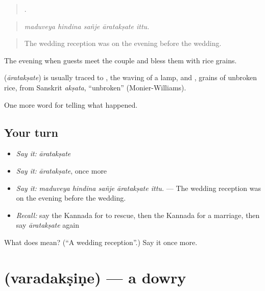 \begin{quote}
    .
\end{quote}

\begin{quote}
\emph{maduveya hindina sañje āratakṣate ittu.}
\end{quote}

\begin{quote}
The wedding reception was on the evening before the wedding.
\end{quote}

The evening when guests meet the couple and bless them with rice grains.

\begin{cousinweb}
\textbf{} (\emph{āratakṣate}) is usually traced to , the waving of a lamp, and , grains of unbroken rice, from Sanskrit \emph{akṣata}, \textquotedblleft{}unbroken\textquotedblright{} (Monier-Williams).
\end{cousinweb}

\begin{grammarlens}[title={What you've built}]
One more word for telling what happened.
\end{grammarlens}

\subsection*{Your turn}
\begin{itemize}
\raggedright
  \item \emph{Say it:} \emph{āratakṣate}
  \item \emph{Say it:} \emph{āratakṣate}, once more
  \item \emph{Say it:} \emph{maduveya hindina sañje āratakṣate ittu.} — The wedding reception was on the evening before the wedding.
  \item \emph{Recall:} say the Kannada for to rescue, then the Kannada for a marriage, then say \emph{āratakṣate} again
\end{itemize}

\begin{tcolorbox}[breakable,colback=teal!4,colframe=teal!35!black,title={Before you move on}]
What does  mean? (\textquotedblleft{}A wedding reception\textquotedblright{}.) Say it once more.
\end{tcolorbox}
\section[\texorpdfstring{\kn{ವರದಕ್ಷಿಣೆ} (varadakṣiṇe)}{ವರದಕ್ಷಿಣೆ (varadakṣiṇe)}]{ (varadakṣiṇe) — a dowry}

